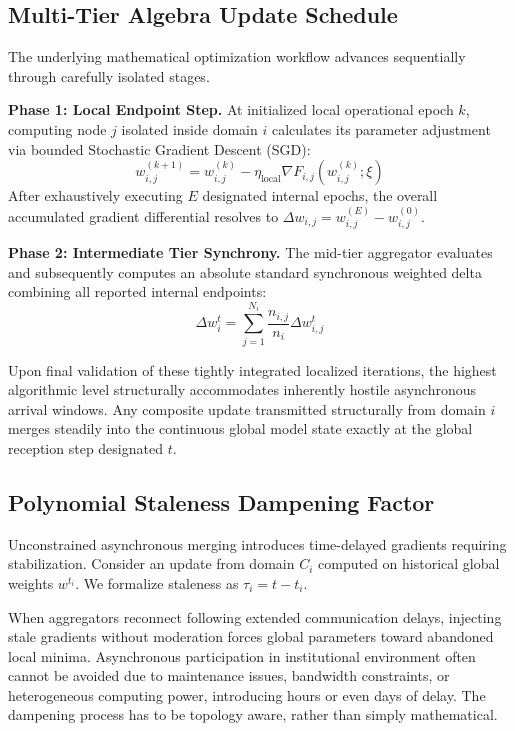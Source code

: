 \documentclass[conference]{IEEEtran}
\begin{document}
\subsection{Multi-Tier Algebra Update Schedule}
The underlying mathematical optimization workflow advances sequentially through carefully isolated stages.

\textbf{Phase 1: Local Endpoint Step.} At initialized local operational epoch $k$, computing node $j$ isolated inside domain $i$ calculates its parameter adjustment via bounded Stochastic Gradient Descent (SGD):
\begin{equation}
w_{i,j}^{(k+1)} = w_{i,j}^{(k)} - \eta_{\text{local}} \nabla F_{i,j}(w_{i,j}^{(k)}; \xi)
\end{equation}
After exhaustively executing $E$ designated internal epochs, the overall accumulated gradient differential resolves to $\Delta w_{i,j} = w_{i,j}^{(E)} - w_{i,j}^{(0)}$.

\textbf{Phase 2: Intermediate Tier Synchrony.} The mid-tier aggregator evaluates and subsequently computes an absolute standard synchronous weighted delta combining all reported internal endpoints:
\begin{equation}
\Delta w_i^t = \sum_{j=1}^{N_i} \frac{n_{i,j}}{n_i} \Delta w_{i,j}^t
\end{equation}

Upon final validation of these tightly integrated localized iterations, the highest algorithmic level structurally accommodates inherently hostile asynchronous arrival windows. Any composite update transmitted structurally from domain $i$ merges steadily into the continuous global model state exactly at the global reception step designated $t$. 

\subsection{Polynomial Staleness Dampening Factor}
Unconstrained asynchronous merging introduces time-delayed gradients requiring stabilization. Consider an update from domain $C_i$ computed on historical global weights $w^{t_i}$. We formalize staleness as $\tau_i = t - t_i$.

When aggregators reconnect following extended communication delays, injecting stale gradients without moderation forces global parameters toward abandoned local minima. Asynchronous participation in institutional environment often cannot be avoided due to maintenance issues, bandwidth constraints, or heterogeneous computing power, introducing hours or even days of delay. The dampening process has to be topology aware, rather than simply mathematical.
\end{document}

